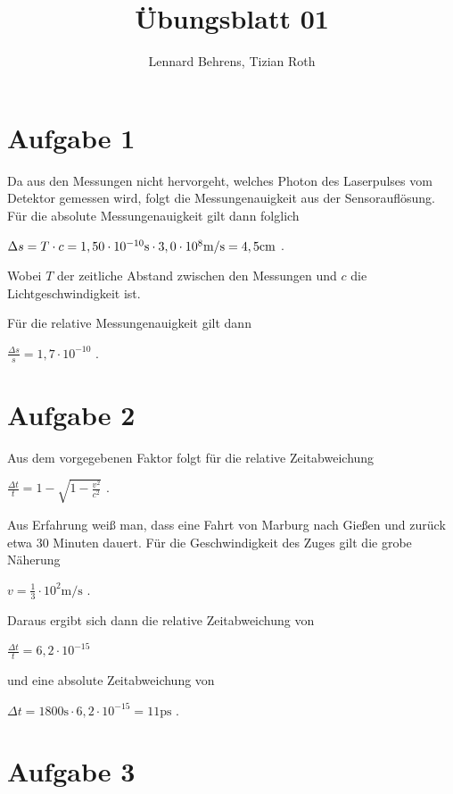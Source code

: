\documentclass[a4paper,11pt]{article}
\title{Übungsblatt 01}
\author{Lennard Behrens, Tizian Roth}
\begin{document}
\maketitle

\section{Aufgabe 1}

Da aus den Messungen nicht hervorgeht, welches Photon des Laserpulses vom Detektor gemessen wird, folgt die Messungenauigkeit aus der Sensorauflösung. 
Für die absolute Messungenauigkeit gilt dann folglich \\
\begin{center}
  $\Delta s = T \cdot c = 1,50 \cdot 10^{-10} \mbox s \cdot 3,0 \cdot 10^{8} \mbox{m/s} = 4,5 \mbox{cm}$ .
\end{center}
Wobei $T$ der zeitliche Abstand zwischen den Messungen und $c$ die Lichtgeschwindigkeit ist. \par
Für die relative Messungenauigkeit gilt dann
\begin{center}
  $\frac{\Delta s}{s} = 1,7 \cdot 10^{-10} $ .
\end{center}


\section{Aufgabe 2}

Aus dem vorgegebenen Faktor folgt für die relative Zeitabweichung
\begin{center}
  $\frac{\Delta t}{t} = 1 - \sqrt{1 - \frac{v^2}{c^2}}$ .
\end{center}
Aus Erfahrung weiß man, dass eine Fahrt von Marburg nach Gießen und zurück etwa $30$ Minuten dauert. 
Für die Geschwindigkeit des Zuges gilt die grobe Näherung
\begin{center}
  $v = \frac 1 3 \cdot 10^2 \mbox{m/s}$ .
\end{center}
Daraus ergibt sich dann die relative Zeitabweichung von
\begin{center}
  $\frac{\Delta t}{t} = 6,2 \cdot 10^{-15} $
\end{center}
und eine absolute Zeitabweichung von
\begin{center}
  $\Delta t = 1800 \mbox{s} \cdot 6,2 \cdot 10^{-15} = 11 \mbox{ps}$ .  
\end{center}


\section{Aufgabe 3}
\end{document}
